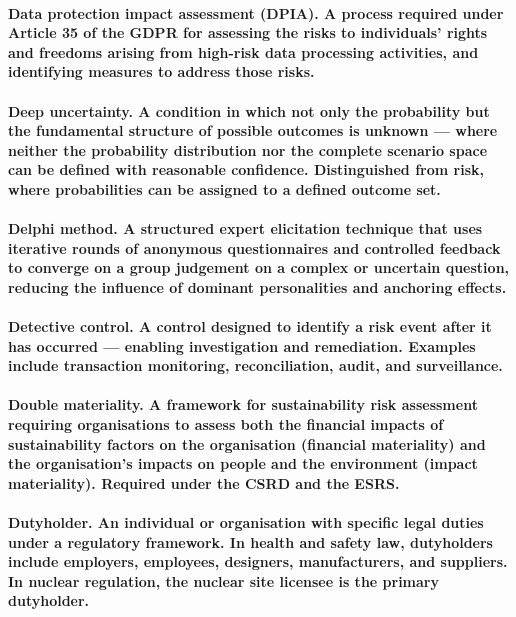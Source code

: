 \paragraph{\textbf{Data protection impact assessment (DPIA)}. A process required under Article 35 of the GDPR for assessing the risks to individuals' rights and freedoms arising from high-risk data processing activities, and identifying measures to address those risks.}

\paragraph{\textbf{Deep uncertainty}. A condition in which not only the probability but the fundamental structure of possible outcomes is unknown — where neither the probability distribution nor the complete scenario space can be defined with reasonable confidence. Distinguished from risk, where probabilities can be assigned to a defined outcome set.}

\paragraph{\textbf{Delphi method}. A structured expert elicitation technique that uses iterative rounds of anonymous questionnaires and controlled feedback to converge on a group judgement on a complex or uncertain question, reducing the influence of dominant personalities and anchoring effects.}

\paragraph{\textbf{Detective control}. A control designed to identify a risk event after it has occurred — enabling investigation and remediation. Examples include transaction monitoring, reconciliation, audit, and surveillance.}

\paragraph{\textbf{Double materiality}. A framework for sustainability risk assessment requiring organisations to assess both the financial impacts of sustainability factors on the organisation (financial materiality) and the organisation's impacts on people and the environment (impact materiality). Required under the CSRD and the ESRS.}

\paragraph{\textbf{Dutyholder}. An individual or organisation with specific legal duties under a regulatory framework. In health and safety law, dutyholders include employers, employees, designers, manufacturers, and suppliers. In nuclear regulation, the nuclear site licensee is the primary dutyholder.}

